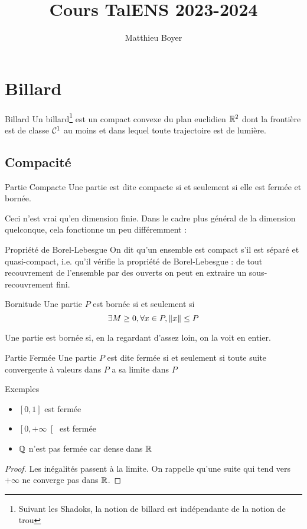 \documentclass{cours}
\title{Cours TalENS 2023-2024}
\author{Matthieu Boyer}
\begin{document}
\section{Billard}
\begin{définition}{Billard}{}
Un billard\footnote{Suivant les Shadoks, la notion de billard est indépendante de la notion de trou} est un compact convexe du plan euclidien $\mathbb{R}^{2}$ dont la frontière est de classe $\mathcal{C}^{1}$ au moins et dans lequel toute trajectoire est de lumière.
\end{définition}

\subsection{Compacité}
\begin{définition}{Partie Compacte}{}
Une partie est dite compacte si et seulement si elle est fermée et bornée.
\end{définition}
Ceci n'est vrai qu'en dimension finie. Dans le cadre plus général de la dimension quelconque, cela fonctionne un peu différemment :
\begin{définition}{Propriété de Borel-Lebesgue}{}
On dit qu'un ensemble est compact s'il est séparé et quasi-compact, i.e. qu'il vérifie la propriété de Borel-Lebesgue : de tout recouvrement de l'ensemble par des ouverts on peut en extraire un sous-recouvrement fini.
\end{définition}

\begin{définition}{Bornitude}{} Une partie $P$ est bornée si et seulement si \vspace{-15pt}\[\exists M \geq 0, \forall x \in P, \left\lVert x \right\rVert \leq P\]
\end{définition}
Une partie est bornée si, en la regardant d'assez loin, on la voit en entier.
\begin{définition}{Partie Fermée}{}
Une partie $P$ est dite fermée si et seulement si toute suite convergente à valeurs dans $P$ a sa limite dans $P$
\end{définition}
\begin{propositionfr}{Exemples}{}
    \begin{itemize}
        \item $\left[0, 1\right]$ est fermée
        \item $\left[0, +\infty\right[$ est fermée
        \item $\mathbb{Q}$ n'est pas fermée car dense dans $\mathbb{R}$
    \end{itemize}
\end{propositionfr}
\begin{proof}
    Les inégalités passent à la limite. On rappelle qu'une suite qui tend vers $+\infty$ ne converge pas dans $\mathbb{R}$.
\end{proof}
\end{document}
